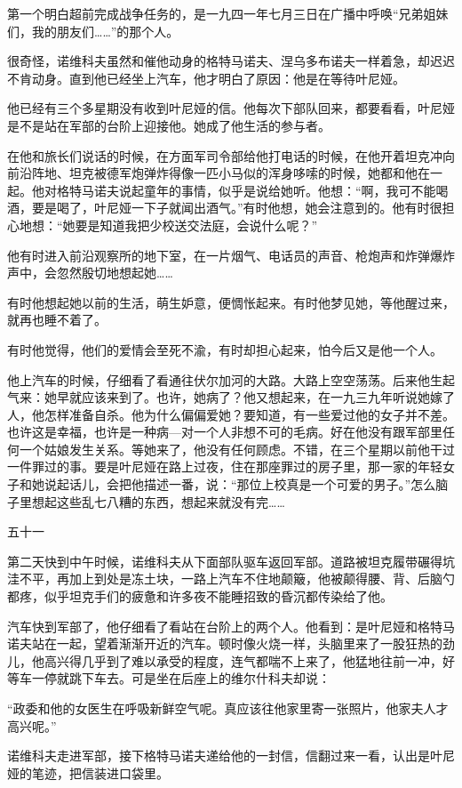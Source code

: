 第一个明白超前完成战争任务的，是一九四一年七月三日在广播中呼唤“兄弟姐妹们，我的朋友们……”的那个人。

很奇怪，诺维科夫虽然和催他动身的格特马诺夫、涅乌多布诺夫一样着急，却迟迟不肯动身。直到他已经坐上汽车，他才明白了原因：他是在等待叶尼娅。

他已经有三个多星期没有收到叶尼娅的信。他每次下部队回来，都要看看，叶尼娅是不是站在军部的台阶上迎接他。她成了他生活的参与者。

在他和旅长们说话的时候，在方面军司令部给他打电话的时候，在他开着坦克冲向前沿阵地、坦克被德军炮弹炸得像一匹小马似的浑身哆嗦的时候，她都和他在一起。他对格特马诺夫说起童年的事情，似乎是说给她听。他想：“啊，我可不能喝酒，要是喝了，叶尼娅一下子就闻出酒气。”有时他想，她会注意到的。他有时很担心地想：“她要是知道我把少校送交法庭，会说什么呢？”

他有时进入前沿观察所的地下室，在一片烟气、电话员的声音、枪炮声和炸弹爆炸声中，会忽然殷切地想起她……

有时他想起她以前的生活，萌生妒意，便惆怅起来。有时他梦见她，等他醒过来，就再也睡不着了。

有时他觉得，他们的爱情会至死不渝，有时却担心起来，怕今后又是他一个人。

他上汽车的时候，仔细看了看通往伏尔加河的大路。大路上空空荡荡。后来他生起气来：她早就应该来到了。也许，她病了？他又想起来，在一九三九年听说她嫁了人，他怎样准备自杀。他为什么偏偏爱她？要知道，有一些爱过他的女子并不差。也许这是幸福，也许是一种病—对一个人非想不可的毛病。好在他没有跟军部里任何一个姑娘发生关系。等她来了，他没有任何顾虑。不错，在三个星期以前他干过一件罪过的事。要是叶尼娅在路上过夜，住在那座罪过的房子里，那一家的年轻女子和她说起话儿，会把他描述一番，说：“那位上校真是一个可爱的男子。”怎么脑子里想起这些乱七八糟的东西，想起来就没有完……

五十一

第二天快到中午时候，诺维科夫从下面部队驱车返回军部。道路被坦克履带碾得坑洼不平，再加上到处是冻土块，一路上汽车不住地颠簸，他被颠得腰、背、后脑勺都疼，似乎坦克手们的疲惫和许多夜不能睡招致的昏沉都传染给了他。

汽车快到军部了，他仔细看了看站在台阶上的两个人。他看到：是叶尼娅和格特马诺夫站在一起，望着渐渐开近的汽车。顿时像火烧一样，头脑里来了一股狂热的劲儿，他高兴得几乎到了难以承受的程度，连气都喘不上来了，他猛地往前一冲，好等车一停就跳下车去。可是坐在后座上的维尔什科夫却说：

“政委和他的女医生在呼吸新鲜空气呢。真应该往他家里寄一张照片，他家夫人才高兴呢。”

诺维科夫走进军部，接下格特马诺夫递给他的一封信，信翻过来一看，认出是叶尼娅的笔迹，把信装进口袋里。

